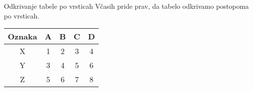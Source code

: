 \begin{frame}{Odkrivanje tabele po vrsticah}
	Včasih pride prav, da tabelo odkrivamo postopoma po vrsticah.
	\begin{center}
		\begin{tabular}{c|cccc}
		   Oznaka & A & B & C & D \\ \hline
		   X & 1 & 2 & 3 & 4 \\
		   Y & 3 & 4 & 5 & 6 \\
		   Z & 5 & 6 & 7 & 8
		\end{tabular}
	\end{center}
\end{frame}
 

%
